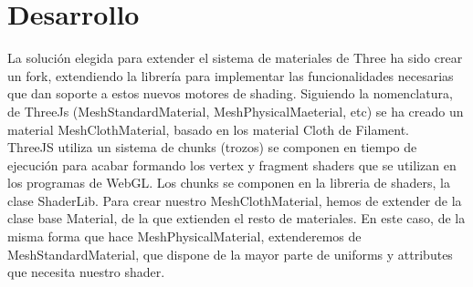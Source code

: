 \chapter{Desarrollo}

La soluci\'on elegida para extender el sistema de materiales de Three ha sido crear un fork, extendiendo la
librer\'ia para implementar las funcionalidades necesarias que dan soporte a estos nuevos motores de shading.
Siguiendo la nomenclatura, de ThreeJs (MeshStandardMaterial, MeshPhysicalMaeterial, etc) se ha creado un material
MeshClothMaterial, basado en los material Cloth de Filament.\\
ThreeJS utiliza un sistema de chunks (trozos) se componen en tiempo de ejecuci\'on para acabar formando los vertex
y fragment shaders que se utilizan en los programas de WebGL. Los chunks se componen en la libreria de shaders, la
clase ShaderLib.
Para crear nuestro MeshClothMaterial, hemos de extender de la clase base Material, de la que extienden el resto de
materiales. En este caso, de la misma forma que hace MeshPhysicalMaterial, extenderemos de MeshStandardMaterial,
que dispone de la mayor parte de uniforms y attributes que necesita nuestro shader.\\

